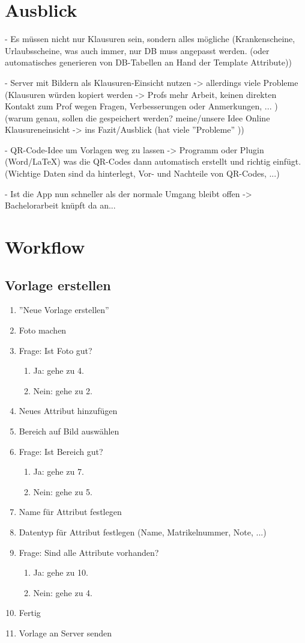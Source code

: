 \documentclass[nomenclature, oneside, 150]{HSMW-Thesis}
\begin{document}
\chapter{Ausblick}
	- Es müssen nicht nur Klausuren sein, sondern alles mögliche (Krankenscheine, Urlaubsscheine, was auch immer, nur DB muss angepasst werden. (oder automatisches generieren von DB-Tabellen an Hand der Template Attribute))
	
	- Server mit Bildern als Klausuren-Einsicht nutzen -> allerdings viele Probleme (Klausuren würden kopiert werden -> Profs mehr Arbeit, keinen direkten Kontakt zum Prof wegen Fragen, Verbesserungen oder Anmerkungen, ... )
	  (warum genau, sollen die gespeichert werden? meine/unsere Idee Online Klausureneinsicht -> ins Fazit/Ausblick (hat viele ''Probleme'' ))
	
	- QR-Code-Idee um Vorlagen weg zu lassen -> Programm oder Plugin (Word/LaTeX) was die QR-Codes dann automatisch erstellt und richtig einfügt. (Wichtige Daten sind da hinterlegt, Vor- und Nachteile von QR-Codes, ...)
	
	- Ist die App nun schneller als der normale Umgang bleibt offen -> Bachelorarbeit knüpft da an...
	

\Anhang

\chapter{Workflow}
	\section*{Vorlage erstellen}
	\begin{enumerate}
		\item ''Neue Vorlage erstellen''
		\item Foto machen
		\item Frage: Ist Foto gut? 
		\begin{enumerate}
			\item Ja: gehe zu 4.
			\item Nein: gehe zu 2.
		\end{enumerate}
		\item Neues Attribut hinzufügen
		\item Bereich auf Bild auswählen
		\item Frage: Ist Bereich gut?
		\begin{enumerate}
			\item Ja: gehe zu 7.
			\item Nein: gehe zu 5.
		\end{enumerate}
		\item Name für Attribut festlegen
		\item Datentyp für Attribut festlegen (Name, Matrikelnummer, Note, ...)
		\item Frage: Sind alle Attribute vorhanden?
		\begin{enumerate}
			\item Ja: gehe zu 10.
			\item Nein: gehe zu 4.
		\end{enumerate}
		\item Fertig
		\item Vorlage an Server senden
	\end{enumerate}
	
\end{document}
